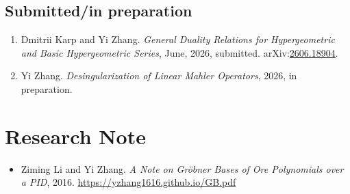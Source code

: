 \documentclass[a4paper,12pt]{article}
\begin{document}
\subsection*{Submitted/in preparation}
\begin{enumerate}
\item  Dmitrii Karp and Yi Zhang. {\em General Duality Relations for Hypergeometric and Basic Hypergeometric Series}, June, 2026, submitted. arXiv:\href{https://arxiv.org/abs/2606.18904}{2606.18904}.
\item Yi Zhang. 
{\em Desingularization of Linear Mahler Operators}, 2026, in preparation.

\end{enumerate}

\section*{\Large{Research Note}}
\begin{itemize}
 \item Ziming Li and Yi Zhang. {\em A Note on Gr\"{o}bner Bases of Ore Polynomials over a PID}, 2016. 
 \url{https://yzhang1616.github.io/GB.pdf} 
\end{itemize}
\end{document}
